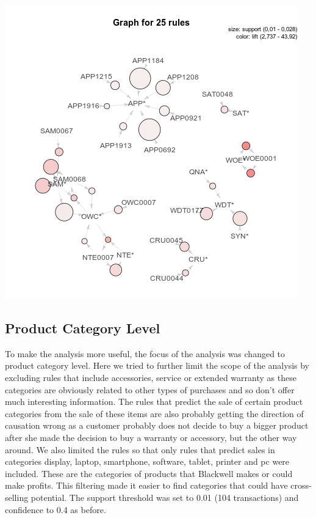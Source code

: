 \documentclass[12pt,a4paper,leqno]{report}
\theoremstyle{plain}
\theoremstyle{definition}
\theoremstyle{remark}
\begin{document}
\bigskip
{
    \centering
    \includegraphics[width=\textwidth,height=\textheight,keepaspectratio]{apriori_brand_level_graph.png}
    \par
}
\bigskip


\subsection{Product Category Level}

To make the analysis more useful, the focus of the analysis was changed to product category level. Here we
tried to further limit the scope of the analysis by excluding rules that include accessories, service or extended
warranty as these categories are obviously related to other types of purchases and so don't offer much interesting
information. The rules that predict the sale of certain product categories from the sale of these items
are also probably getting the direction of causation wrong as a customer probably does not decide
to buy a bigger product after she made the decision to buy a warranty or accessory, but the other way around.
We also limited the rules so that only rules that predict sales in categories
display, laptop, smartphone, software, tablet, printer and pc
were included. These are the categories of products that Blackwell makes or could make profits. This
filtering made it easier to find categories that could have cross-selling potential. The support
threshold was set to 0.01 (104 transactions) and confidence to 0.4 as before.
\end{document}
